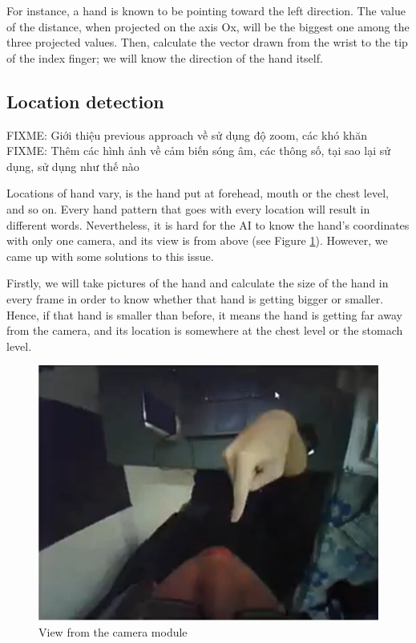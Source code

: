 For instance, a hand is known to be pointing toward the left direction. The value of the distance, when projected on the axis Ox, will be the biggest one among the three projected values. Then, calculate the vector drawn from the wrist to the tip of the index finger; we will know the direction of the hand itself.

\subsection{Location detection}
FIXME: Giới thiệu previous approach về sử dụng độ zoom, các khó khăn
FIXME: Thêm các hình ảnh về cảm biến sóng âm, các thông số, tại sao lại sử dụng, sử dụng như thế nào

Locations of hand vary, is the hand put at forehead, mouth or the chest level, and so on. Every hand pattern that goes with every location will result in different words. Nevertheless, it is hard for the AI to know the hand's coordinates with only one camera, and its view is from above (see Figure \ref{fig:Chap4-ViewFromCamera}). However, we came up with some solutions to this issue.

Firstly, we will take pictures of the hand and calculate the size of the hand in every frame in order to know whether that hand is getting bigger or smaller. Hence, if that hand is smaller than before, it means the hand is getting far away from the camera, and its location is somewhere at the chest level or the stomach level.

\begin{figure}[H]
	\centering
	\includegraphics[width=\textwidth]{img/Chap4/ViewFromCamera.png}
	\caption{View from the camera module}
	\label{fig:Chap4-ViewFromCamera}
\end{figure}

